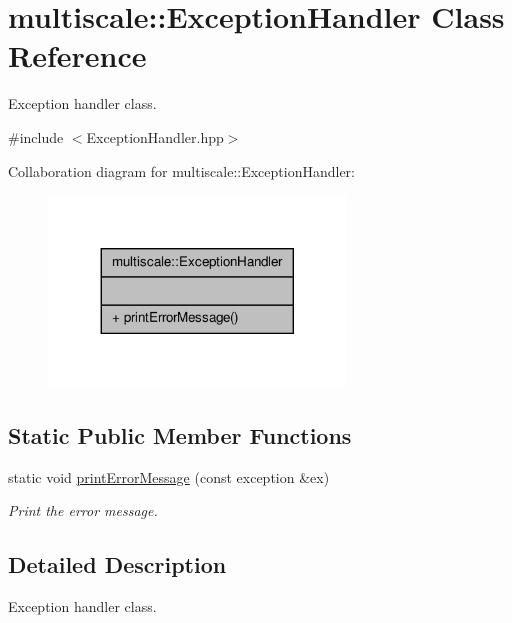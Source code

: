 \hypertarget{classmultiscale_1_1ExceptionHandler}{\section{multiscale\-:\-:Exception\-Handler Class Reference}
\label{classmultiscale_1_1ExceptionHandler}
}


Exception handler class.  




{\ttfamily \#include $<$Exception\-Handler.\-hpp$>$}



Collaboration diagram for multiscale\-:\-:Exception\-Handler\-:
\nopagebreak
\begin{figure}[H]
\begin{center}
\leavevmode
\includegraphics[width=224pt]{classmultiscale_1_1ExceptionHandler__coll__graph}
\end{center}
\end{figure}
\subsection*{Static Public Member Functions}
\begin{DoxyCompactItemize}
\item 
static void \hyperlink{classmultiscale_1_1ExceptionHandler_ac57f49fa242649f17c86409f37629455}{print\-Error\-Message} (const exception \&ex)
\begin{DoxyCompactList}\small\item\em Print the error message. \end{DoxyCompactList}\end{DoxyCompactItemize}


\subsection{Detailed Description}
Exception handler class. 

